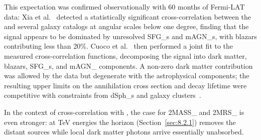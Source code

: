 This expectation was confirmed observationally with 60 months of Fermi-LAT data: Xia et al.~\cite{xia2015tomography} detected a statistically significant cross-correlation between the \UGRB and several galaxy catalogs at angular scales below one degree, finding that the signal appears to be dominated by unresolved \glspl{SFG_} and \glspl{mAGN_}, with blazars contributing less than 20\%.
Cuoco et al.~\cite{Cuoco:2015rfa} then performed a joint fit to the measured cross-correlation functions, decomposing the signal into dark matter, blazars, \glspl{SFG_}, and \gls{mAGN_} components.
A non-zero dark matter contribution was allowed by the data but degenerate with the astrophysical components; the resulting upper limits on the annihilation cross section and decay lifetime were competitive with constraints from \glspl{dSph_} and galaxy clusters~\cite{regis2015particle}.


In the context of cross-correlation with \CTAO, the case for \gls{2MASS_} and \gls{2MRS_} is even stronger: at TeV energies the \EBL horizon (Section~\ref{sec:8.2.1}) removes the distant sources while local dark matter photons arrive essentially unabsorbed.